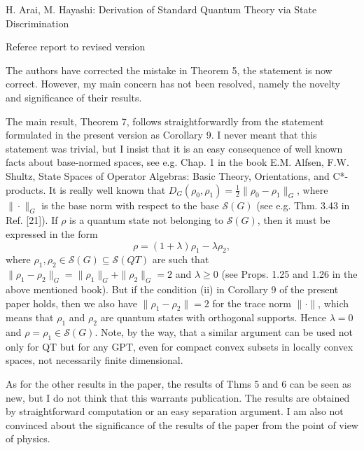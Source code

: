 \documentclass[12pt]{article}
\begin{document}
\begin{center}
{\large H. Arai, M. Hayashi:  Derivation of Standard Quantum Theory via State
Discrimination
}

\end{center}
\medskip

\centerline{Referee report to revised version}

\bigskip

The authors have corrected the mistake in Theorem 5, the statement is now correct.
However, my main concern has not been resolved, namely the novelty and significance of
their results.


The main result, Theorem 7, follows straightforwardly from the statement formulated in the present
version as Corollary 9. I never meant that this statement was trivial, but I insist that
it is an easy consequence of well known facts  about base-normed spaces, see e.g. Chap. 1
in the book E.M. Alfsen, F.W. Shultz, State Spaces of Operator Algebras: Basic Theory,
Orientations, and C*-products. It is really well known that
$D_G(\rho_0,\rho_1)=\frac12\|\rho_0-\rho_1\|_G$, where $\|\cdot\|_G$ is the base norm with
respect to the base $\mathcal S(G)$ (see e.g. Thm. 3.43 in Ref. [21]). If $\rho$ is a quantum state not belonging to
$\mathcal S(G)$, then it must be expressed in the form
\[
\rho=(1+\lambda)\rho_1-\lambda\rho_2,
\]
where $\rho_1,\rho_2\in \mathcal S(G)\subseteq \mathcal S(QT)$ are such that
$\|\rho_1-\rho_2\|_G=\|\rho_1\|_G+\|\rho_2\|_G=2$ and $\lambda\ge 0$ (see Props. 1.25 and 1.26 in the above mentioned
book). But if the condition (ii) in Corollary 9 of the present paper holds, then we also
have $\|\rho_1-\rho_2\|=2$ for the trace norm $\|\cdot\|$, which means that $\rho_1$ and
$\rho_2$ are quantum states with orthogonal supports. Hence $\lambda=0$ and $\rho=\rho_1\in \mathcal S(G)$. 
Note, by the way, that a similar argument can be used not only for QT but
for any  GPT, even for compact convex subsets in locally convex spaces, not necessarily
finite  dimensional. 

As for the other results in the paper, the results of Thms 5 and 6 can be seen as new, but
I do not think that this warrants publication. The results are obtained by straightforward
computation or an easy separation argument.  I am also not convinced about the  significance of
the results of the paper  from the point of view of physics.
\end{document}
